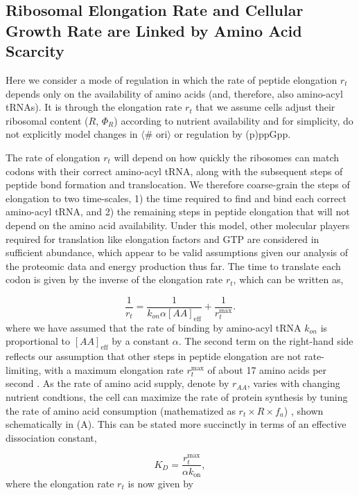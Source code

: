 \subsection{Ribosomal Elongation Rate and Cellular Growth Rate are Linked by
Amino Acid Scarcity}
Here we consider a mode of regulation in which the rate of peptide elongation
$r_t$ depends only on the availability of amino acids (and, therefore, also
amino-acyl tRNAs). It is through the elongation rate $r_t$ that we assume cells
adjust their ribosomal content ($R$, $\Phi_R$) according to nutrient
availability and for simplicity, do not explicitly model changes in  $\langle$\#
ori$\rangle$ or regulation by (p)ppGpp.

The rate of elongation $r_t$ will depend on how quickly the ribosomes can match
codons with their correct amino-acyl tRNA, along with the subsequent steps of
peptide bond formation and translocation. We therefore coarse-grain the steps of
elongation to two time-scales,  1) the time required to find and bind each
correct amino-acyl tRNA, and 2) the remaining steps in peptide elongation that
will not depend on the amino acid availability. Under this model, other
molecular players required for translation like elongation factors and GTP are
considered in sufficient abundance, which appear to be valid assumptions given
our analysis of the proteomic data and energy production thus far. The time to
translate each codon is given by the inverse of the elongation rate $r_t$, which
can be written as,

\begin{equation}
\frac{1}{r_t} = \frac{1}{k_{on} \alpha [AA]_{\text{eff}}} + \frac{1}{r_{t}^{\text{max}}}.
\end{equation}
where we have assumed that the rate of binding by amino-acyl tRNA $k_{on}$ is
proportional to $[AA]_{\text{eff}}$ by a constant $\alpha$. The second term on
the right-hand side reflects our assumption that other steps in peptide
elongation are not rate-limiting, with a maximum elongation rate
$r_{t}^{\text{max}}$ of about 17 amino acids per second \cite{dai2016}. As the
rate of amino acid supply, denote by $r_{AA}$, varies with changing nutrient
condtions, the cell can maximize the rate of protein synthesis by tuning the
rate of amino acid consumption (mathematized as $r_t \times R \times f_a$) ,
shown schematically in (A). This can be stated more
succinctly in terms of an effective dissociation constant,

\begin{equation}
    K_D = \frac{r_{t}^{\text{max}}}{\alpha k_\text{on}},
\end{equation}
where the elongation rate $r_t$ is now given by

